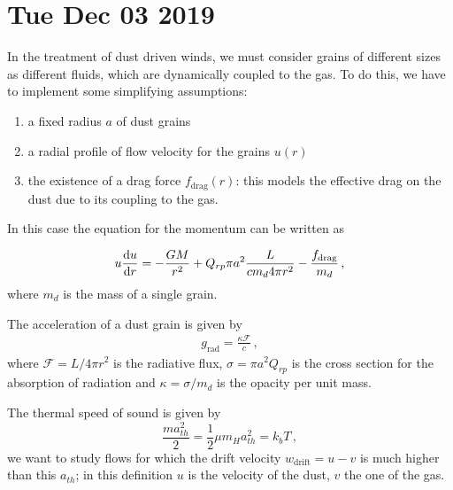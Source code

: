 \documentclass[main.tex]{subfiles}
\begin{document}
\section*{Tue Dec 03 2019}


In the treatment of dust driven winds, we must consider grains of different sizes as different fluids, which are dynamically coupled to the gas.
To do this, we have to implement some simplifying assumptions:
\begin{enumerate}
    \item a fixed radius $a$ of dust grains
    \item a radial profile of flow velocity for the grains $u(r)$
    \item the existence of a drag force $f_{\text{drag}}(r)$: this models the effective drag on the dust due to its coupling to the gas.
\end{enumerate}

In this case the equation for the momentum can be written as

\begin{equation}
u \dv{u}{r} = -\frac{GM}{r^2}+Q_{rp}\pi a^2 \frac{L}{c m_d 4\pi r^2}-\frac{f_{\text{drag}}}{m_d}
\,,
\end{equation}
%
where \(m_d\) is the mass of a single grain. 

The acceleration of a dust grain is given by 
%
\begin{align}
g _{\text{rad}} = \frac{\kappa \mathcal{F}}{c}
\,,
\end{align}
%
where \(\mathcal{F} = L / 4 \pi r^2\) is the radiative flux, \(\sigma = \pi a^2 Q_{rp}\) is the cross section for the absorption of radiation and \(\kappa = \sigma / m_d\) is the opacity per unit mass.

The thermal speed of sound is given by
\begin{equation}
\frac{m a_{th}^2}{2} = \frac{1}{2} \mu m_H a^2_{th} =k_b T
\,,
\end{equation}
we want to study flows for which the drift velocity $w_{\text{drift}}=u-v$ is much higher than this $a_{th}$; in this definition
\(u\) is the velocity of the dust, \(v\) the one of the gas.
\end{document}
